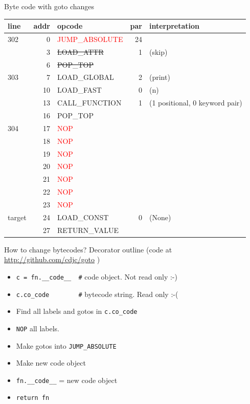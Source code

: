 \documentclass{beamer}
\begin{document}
\begin{frame}[fragile]{Byte code with goto changes}
\begin{tabular}{l|r|l|r|l}
line & addr & opcode & par & interpretation \\
\hline
302 &          0 & \textcolor{red}{JUMP\_ABSOLUTE}         &     24 &  \\
     &           3 &  \sout{LOAD\_ATTR}               &   1  & (skip)  \\
      &          6 &  \sout{POP\_TOP}      &  &           \\
\hline
303   &          7 &  LOAD\_GLOBAL         &       2  & (print)  \\
          &     10 &  LOAD\_FAST           &       0 &  (n)  \\
              & 13 &  CALL\_FUNCTION        &      1  & (1 positional, 0 keyword pair)  \\
     &          16 &  POP\_TOP            &     &  \\
\hline
304   &         17 &  \textcolor{red}{NOP}        &          &   \\
      &         18 &  \textcolor{red}{NOP}        &          &   \\
      &         19 &  \textcolor{red}{NOP}        &          &   \\
      &         20 &  \textcolor{red}{NOP}        &          &   \\
      &         21 &  \textcolor{red}{NOP}        &          &   \\
      &         22 &  \textcolor{red}{NOP}        &          &   \\
      &         23 &  \textcolor{red}{NOP}        &          &   \\
\hline
target     &          24 &  LOAD\_CONST         &        0  & (None)  \\
     &          27 &  RETURN\_VALUE      &      &  \\
\end{tabular}
\end{frame}

\begin{frame}[fragile]{How to change bytecodes?}
Decorator outline (code at \href{http://github.com/cdjc/goto} {http://github.com/cdjc/goto} )
\begin{itemize}
\item \verb!c = fn.__code__  #! code object. Not read only :-)
\item \verb!c.co_code        #! bytecode string. Read only :-(
\item Find all labels and gotos in \verb!c.co_code!
\item \verb!NOP! all labels.
\item Make gotos into \verb!JUMP_ABSOLUTE!
\item Make new code object
\item \verb!fn.__code__! = new code object
\item \verb!return fn!
\end{itemize}
\end{frame}
\end{document}
